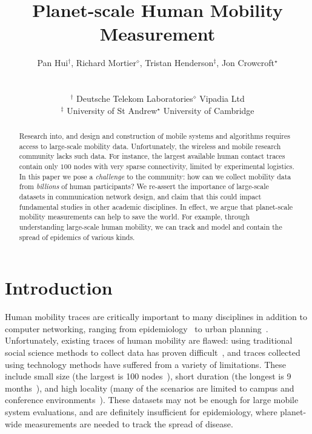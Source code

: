 \documentclass{sig-alternate-10pt}
\begin{document}
\title{Planet-scale Human Mobility Measurement}








\author{
  Pan Hui$^{\dagger}$,
  Richard Mortier$^{\diamond}$,
  Tristan Henderson$^{\ddagger}$,
  Jon Crowcroft$^{\star}$
  \\
  \\
  \begin{tabular}{ll}
  $^{\dagger}$ Deutsche Telekom Laboratories & $^{\diamond}$ Vipadia Ltd\\
  $^{\ddagger}$ University of St Andrew & $^{\star}$ University of Cambridge\\
  \end{tabular}
}
\maketitle
\begin{abstract}
Research into, and design and construction of mobile systems and algorithms
requires access to large-scale mobility data. Unfortunately,
the wireless and mobile research community lacks such data.
For instance, the largest available human contact traces
contain only $100$ nodes with very sparse connectivity, limited by
experimental logistics. In this paper we pose a \textit{challenge} to the
community: how can we collect mobility data from \emph{billions} of
human participants?  We re-assert the importance of large-scale
datasets in communication network design, and claim that this could  impact
fundamental studies in other academic disciplines. In effect, we argue that
planet-scale mobility measurements can help to save the world. For
example, through understanding large-scale human mobility,
we can track and model and contain the spread of epidemics of various
kinds.
\end{abstract}

\section{Introduction}
\vspace{-2mm}
Human mobility traces are critically important to many disciplines in
addition to computer networking, ranging from
epidemiology~\cite{colizza-2007-5} to urban
planning~\cite{strano07centrality}.  Unfortunately, existing traces of
human mobility are flawed: using traditional social science methods to
collect data has proven difficult~\cite{smallworld}, and traces
collected using technology methods have suffered from a variety of
limitations.  These include small size (the largest is 100
nodes~\cite{psn-mobihoc}), short duration (the longest is 9
months~\cite{realityMining}), and high locality (many of the scenarios
are limited to campus and conference environments~\cite{psn-tmc07}).
These datasets may not be enough for large mobile system
evaluations, and are definitely insufficient for epidemiology, where
planet-wide measurements are needed to track the spread of disease.
\end{document}
